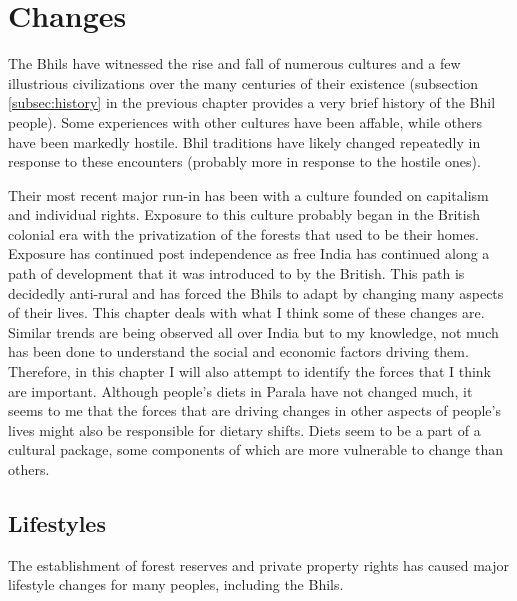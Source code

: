 \documentclass[report.tex]{subfiles}
\begin{document}
\chapter{Changes}

The Bhils have witnessed the rise and fall of numerous cultures and a few illustrious civilizations over the many centuries of their existence (subsection \ref{subsec:history} in the previous chapter provides a very brief history of the Bhil people). Some experiences with other cultures have been affable, while others have been markedly hostile. Bhil traditions have likely changed repeatedly in response to these encounters (probably more in response to the hostile ones).

Their most recent major run-in has been with a culture founded on capitalism and individual rights. Exposure to this culture probably began in the British colonial era with the privatization of the forests that used to be their homes. Exposure has continued post independence as free India has continued along a path of development that it was introduced to by the British. This path is decidedly anti-rural and has forced the Bhils to adapt by changing many aspects of their lives. This chapter deals with what I think some of these changes are. Similar trends are being observed all over India but to my knowledge, not much has been done to understand the social and economic factors driving them. Therefore, in this chapter I will also attempt to identify the forces that I think are important. Although people's diets in Parala have not changed much, it seems to me that the forces that are driving changes in other aspects of people's lives might also be responsible for dietary shifts. Diets seem to be a part of a cultural package, some components of which are more vulnerable to change than others.

\section{Lifestyles}\label{sec:lifestyles}

The establishment of forest reserves and private property rights has caused major lifestyle changes for many peoples, including the Bhils.
\end{document}
